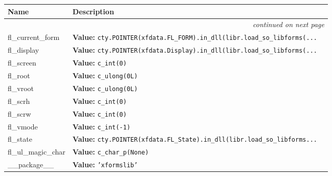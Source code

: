     \vspace{-1cm}
\hspace{\varindent}\begin{longtable}{|p{\varnamewidth}|p{\vardescrwidth}|l}
\cline{1-2}
\cline{1-2} \centering \textbf{Name} & \centering \textbf{Description}& \\
\cline{1-2}
\endhead\cline{1-2}\multicolumn{3}{r}{\small\textit{continued on next page}}\\\endfoot\cline{1-2}
\endlastfoot\raggedright f\-l\-\_\-c\-u\-r\-r\-e\-n\-t\-\_\-f\-o\-r\-m\- & \raggedright \textbf{Value:} 
{\tt cty.POINTER(xfdata.FL\_FORM).in\_dll(libr.load\_so\_libforms(\texttt{...}}&\\
\cline{1-2}
\raggedright f\-l\-\_\-d\-i\-s\-p\-l\-a\-y\- & \raggedright \textbf{Value:} 
{\tt cty.POINTER(xfdata.Display).in\_dll(libr.load\_so\_libforms(\texttt{...}}&\\
\cline{1-2}
\raggedright f\-l\-\_\-s\-c\-r\-e\-e\-n\- & \raggedright \textbf{Value:} 
{\tt c\_int(0)}&\\
\cline{1-2}
\raggedright f\-l\-\_\-r\-o\-o\-t\- & \raggedright \textbf{Value:} 
{\tt c\_ulong(0L)}&\\
\cline{1-2}
\raggedright f\-l\-\_\-v\-r\-o\-o\-t\- & \raggedright \textbf{Value:} 
{\tt c\_ulong(0L)}&\\
\cline{1-2}
\raggedright f\-l\-\_\-s\-c\-r\-h\- & \raggedright \textbf{Value:} 
{\tt c\_int(0)}&\\
\cline{1-2}
\raggedright f\-l\-\_\-s\-c\-r\-w\- & \raggedright \textbf{Value:} 
{\tt c\_int(0)}&\\
\cline{1-2}
\raggedright f\-l\-\_\-v\-m\-o\-d\-e\- & \raggedright \textbf{Value:} 
{\tt c\_int(-1)}&\\
\cline{1-2}
\raggedright f\-l\-\_\-s\-t\-a\-t\-e\- & \raggedright \textbf{Value:} 
{\tt cty.POINTER(xfdata.FL\_State).in\_dll(libr.load\_so\_libforms\texttt{...}}&\\
\cline{1-2}
\raggedright f\-l\-\_\-u\-l\-\_\-m\-a\-g\-i\-c\-\_\-c\-h\-a\-r\- & \raggedright \textbf{Value:} 
{\tt c\_char\_p(None)}&\\
\cline{1-2}
\raggedright \_\-\_\-p\-a\-c\-k\-a\-g\-e\-\_\-\_\- & \raggedright \textbf{Value:} 
{\tt \texttt{'}\texttt{xformslib}\texttt{'}}&\\
\cline{1-2}
\end{longtable}

